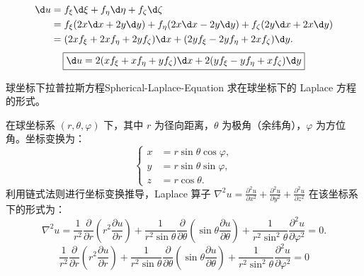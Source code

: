 \begin{solution}

    \begin{equation}
        \begin{aligned}
            \d u & = f_{\xi} \d \xi + f_{\eta} \d \eta + f_{\zeta} \d \zeta                                           \\
                 & = f_{\xi} (2x \d x + 2y \d y) + f_{\eta} (2x \d x - 2y \d y) + f_{\zeta} (2y \d x + 2x \d y)       \\
                 & = (2x f_{\xi} + 2x f_{\eta} + 2y f_{\zeta}) \d x + (2y f_{\xi} - 2y f_{\eta} + 2x f_{\zeta}) \d y.
        \end{aligned}
    \end{equation}
    \begin{equation}
        \boxed{\d u = 2(x f_{\xi} + x f_{\eta} + y f_{\zeta}) \d x + 2(y f_{\xi} - y f_{\eta} + x f_{\zeta}) \d y}
    \end{equation}
\end{solution}

\begin{problem}{球坐标下拉普拉斯方程}{Spherical-Laplace-Equation}
    求在球坐标下的 Laplace 方程的形式。
\end{problem}

\begin{solution}
    在球坐标系 $(r, \theta, \varphi)$ 下，其中 $r$ 为径向距离，$\theta$ 为极角（余纬角），$\varphi$ 为方位角。坐标变换为：
    \begin{equation}
        \left\{
        \begin{aligned}
            x & = r \sin \theta \cos \varphi, \\
            y & = r \sin \theta \sin \varphi, \\
            z & = r \cos \theta.
        \end{aligned}
        \right.
    \end{equation}
    利用链式法则进行坐标变换推导，Laplace 算子 $\nabla^2 u = \frac{\partial^2 u}{\partial x^2} + \frac{\partial^2 u}{\partial y^2} + \frac{\partial^2 u}{\partial z^2}$ 在该坐标系下的形式为：
    \begin{equation}
        \nabla^2 u = \frac{1}{r^2} \frac{\partial}{\partial r} \left( r^2 \frac{\partial u}{\partial r} \right) + \frac{1}{r^2 \sin \theta} \frac{\partial}{\partial \theta} \left( \sin \theta \frac{\partial u}{\partial \theta} \right) + \frac{1}{r^2 \sin^2 \theta} \frac{\partial^2 u}{\partial \varphi^2} = 0.
    \end{equation}
    \begin{equation}
        \boxed{\frac{1}{r^2} \frac{\partial}{\partial r} \left( r^2 \frac{\partial u}{\partial r} \right) + \frac{1}{r^2 \sin \theta} \frac{\partial}{\partial \theta} \left( \sin \theta \frac{\partial u}{\partial \theta} \right) + \frac{1}{r^2 \sin^2 \theta} \frac{\partial^2 u}{\partial \varphi^2} = 0}
    \end{equation}
\end{solution}

